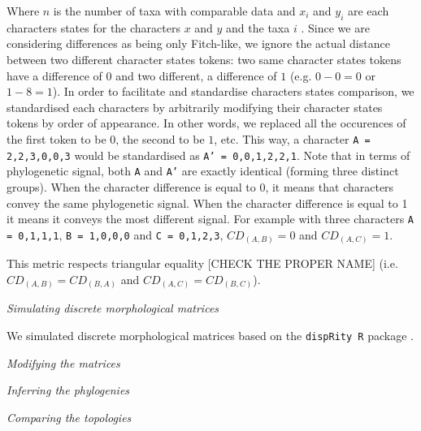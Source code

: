 \documentclass[12pt,letterpaper]{article}
\renewcommand{\subsection}[1]{%
\bigskip
\begin{center}
\begin{large}
\normalfont\itshape #1
\end{large}
\end{center}}
\begin{document}
\noindent Where $n$ is the number of taxa with comparable data and $x_i$ and $y_i$ are each characters states for the characters $x$ and $y$ and the taxa $i$ \citep[i.e. the Gower distance;][]{GowerDist}.
Since we are considering differences as being only Fitch-like, we ignore the actual distance between two different character states tokens: two same character states tokens have a difference of $0$ and two different, a difference of $1$ (e.g. $0 - 0 = 0$ or $1 - 8 = 1$).
In order to facilitate and standardise characters states comparison, we standardised each characters by arbitrarily modifying their character states tokens by order of appearance.
In other words, we replaced all the occurences of the first token to be $0$, the second to be $1$, etc.
This way, a character \texttt{A = {2,2,3,0,0,3}} would be standardised as \texttt{A' = {0,0,1,2,2,1}}. Note that in terms of phylogenetic signal, both \texttt{A} and \texttt{A'} are exactly identical (forming three distinct groups).
When the character difference is equal to $0$, it means that characters convey the same phylogenetic signal.
When the character difference is equal to 1 it means it conveys the most different signal.
For example with three characters \texttt{A = {0,1,1,1}}, \texttt{B = {1,0,0,0}} and \texttt{C = {0,1,2,3}}, $CD_{(A,B)} = 0$ and $CD_{(A,C)} = 1$.

This metric respects triangular equality [CHECK THE PROPER NAME] (i.e. $CD_{(A,B)} = CD_{(B,A)}$ and $CD_{(A,C)} = CD_{(B,C)}$).

\subsection{Simulating discrete morphological matrices}

We simulated discrete morphological matrices based on the \texttt{dispRity R} package \citep[][; \url{https://github.com/TGuillerme/dispRity}]{thomas_guillerme_2016_55646}.

\subsection{Modifying the matrices}

\subsection{Inferring the phylogenies}

\subsection{Comparing the topologies}
\end{document}
